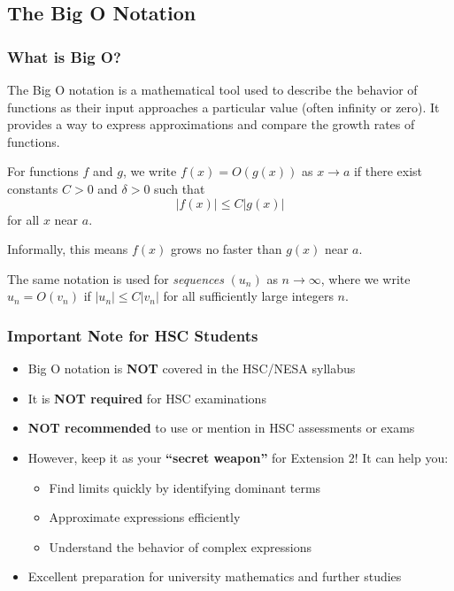 \documentclass[12pt]{article}
\begin{document}
\subsection{The Big O Notation}
\subsubsection{What is Big O?}
The Big O notation is a mathematical tool used to describe the behavior of functions as their input approaches a particular value (often infinity or zero). It provides a way to express approximations and compare the growth rates of functions.

\begin{definition}
For functions $f$ and $g$, we write $f(x) = O(g(x))$ as $x \to a$ if there exist constants $C > 0$ and $\delta > 0$ such that 
\[|f(x)| \leq C|g(x)|\]
for all $x$ near $a$.

\end{definition}

\begin{remark}
  Informally, this means $f(x)$ grows no faster than $g(x)$ near $a$.
\end{remark}

\begin{remark}
  The same notation is used for \emph{sequences} $(u_n)$ as $n \to \infty$, where we write $u_n = O(v_n)$ if $|u_n| \le C|v_n|$ for all sufficiently large integers $n$.
\end{remark}

\subsubsection{Important Note for HSC Students}
\begin{itemize}[leftmargin=*]
  \item Big O notation is \textbf{NOT} covered in the HSC/NESA syllabus
  \item It is \textbf{NOT required} for HSC examinations
  \item \textbf{NOT recommended} to use or mention in HSC assessments or exams
  \item However, keep it as your \textbf{``secret weapon''} for Extension 2! It can help you:
  \begin{itemize}
    \item Find limits quickly by identifying dominant terms
    \item Approximate expressions efficiently
    \item Understand the behavior of complex expressions
  \end{itemize}
  \item Excellent preparation for university mathematics and further studies
\end{itemize}
\end{document}
